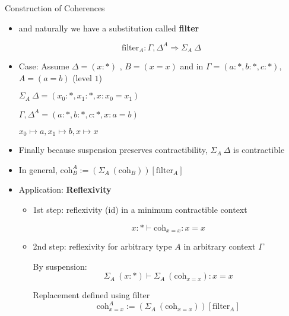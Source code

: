 \documentclass[12pt, mathserif,handout]{beamer}
\begin{document}
\begin{frame}[allowframebreaks,c]{Construction of Coherences}
\begin{itemize}
\framebreak


\item and naturally we have a
substitution called \textbf{filter}

$$\text{filter}_A : \Gamma, \Delta^{A} \Rightarrow \Sigma_A ~ \Delta$$



\item Case: Assume $\Delta = (x : *)$ , $B = (x = x)$
and in $\Gamma = (a : *, b : *, c : *)$, $A = (a = b)$ (level $1$)

$\Sigma_{A} ~ \Delta = (x_0 : *, x_1 : *, x : x_0 = x_1)$

$\Gamma, \Delta^{A} = (a : *, b : *, c : *, x : a = b)$

$x_0 \mapsto a , x_1 \mapsto b , x \mapsto x$

\item Finally because suspension preserves contractibility, $\Sigma_{A} ~ \Delta$ is contractible

\item In general, $\text{coh}_{B}^{A} := (\Sigma_A ~(\text{coh}_{B})) [ \text{filter}_A ]$ 

\framebreak

\item Application: \textbf{Reflexivity}

\begin{itemize}

\item 1st step: reflexivity (id) in a minimum contractible context

$$x : * \vdash \text{coh}_{x=x} : x = x$$

\item 2nd step: reflexivity for arbitrary type $A$ in arbitrary
  context $\Gamma$

By suspension: $$\Sigma_A ~(x:*) \vdash \Sigma_A ~(\text{coh}_{x=x}) : x = x$$

Replacement defined using filter $$ \text{coh}_{x=x}^{A} := (\Sigma_A ~(\text{coh}_{x=x})) [ \text{filter}_A ]$$ 
\end{itemize}

\end{itemize}
\end{frame}
\end{document}
